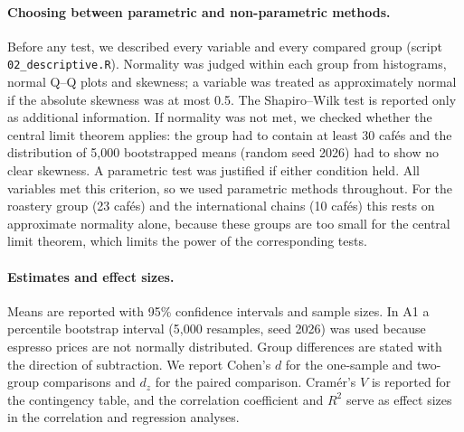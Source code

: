 \documentclass[11pt,a4paper]{article}
\begin{document}
\paragraph{Choosing between parametric and non-parametric methods.} Before any test, we described every variable and every compared group (script \texttt{02\_descriptive.R}). Normality was judged within each group from histograms, normal Q--Q plots and skewness; a variable was treated as approximately normal if the absolute skewness was at most 0.5. The Shapiro--Wilk test is reported only as additional information. If normality was not met, we checked whether the central limit theorem applies: the group had to contain at least 30 caf\'es and the distribution of 5{,}000 bootstrapped means (random seed 2026) had to show no clear skewness. A parametric test was justified if either condition held. All variables met this criterion, so we used parametric methods throughout. For the roastery group (23 caf\'es) and the international chains (10 caf\'es) this rests on approximate normality alone, because these groups are too small for the central limit theorem, which limits the power of the corresponding tests.

\paragraph{Estimates and effect sizes.} Means are reported with 95\% confidence intervals and sample sizes. In A1 a percentile bootstrap interval (5{,}000 resamples, seed 2026) was used because espresso prices are not normally distributed. Group differences are stated with the direction of subtraction. We report Cohen's $d$ for the one-sample and two-group comparisons and $d_z$ for the paired comparison. Cram\'er's $V$ is reported for the contingency table, and the correlation coefficient and $R^2$ serve as effect sizes in the correlation and regression analyses.
\end{document}

